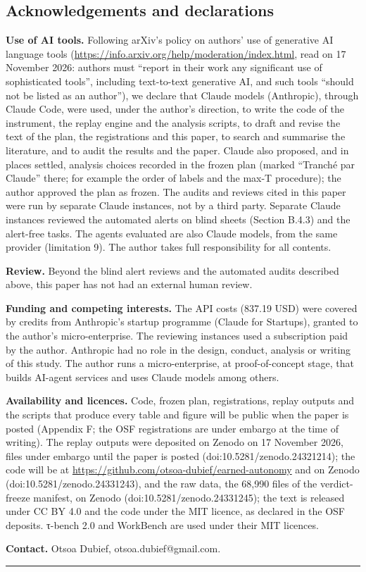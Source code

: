 \subsection{Acknowledgements and declarations}\label{acknowledgements-and-declarations}

\textbf{Use of AI tools.} Following arXiv's policy on authors' use of generative AI language tools (\url{https://info.arxiv.org/help/moderation/index.html}, read on 17 November 2026: authors must ``report in their work any significant use of sophisticated tools'', including text-to-text generative AI, and such tools ``should not be listed as an author''), we declare that Claude models (Anthropic), through Claude Code, were used, under the author's direction, to write the code of the instrument, the replay engine and the analysis scripts, to draft and revise the text of the plan, the registrations and this paper, to search and summarise the literature, and to audit the results and the paper. Claude also proposed, and in places settled, analysis choices recorded in the frozen plan (marked ``Tranché par Claude'' there; for example the order of labels and the max-T procedure); the author approved the plan as frozen. The audits and reviews cited in this paper were run by separate Claude instances, not by a third party. Separate Claude instances reviewed the automated alerts on blind sheets (Section B.4.3) and the alert-free tasks. The agents evaluated are also Claude models, from the same provider (limitation 9). The author takes full responsibility for all contents.

\textbf{Review.} Beyond the blind alert reviews and the automated audits described above, this paper has not had an external human review.

\textbf{Funding and competing interests.} The API costs (837.19 USD) were covered by credits from Anthropic's startup programme (Claude for Startups), granted to the author's micro-enterprise. The reviewing instances used a subscription paid by the author. Anthropic had no role in the design, conduct, analysis or writing of this study. The author runs a micro-enterprise, at proof-of-concept stage, that builds AI-agent services and uses Claude models among others.

\textbf{Availability and licences.} Code, frozen plan, registrations, replay outputs and the scripts that produce every table and figure will be public when the paper is posted (Appendix F; the OSF registrations are under embargo at the time of writing). The replay outputs were deposited on Zenodo on 17 November 2026, files under embargo until the paper is posted (doi:10.5281/zenodo.24321214); the code will be at \url{https://github.com/otsoa-dubief/earned-autonomy} and on Zenodo (doi:10.5281/zenodo.24331243), and the raw data, the 68,990 files of the verdict-freeze manifest, on Zenodo (doi:10.5281/zenodo.24331245); the text is released under CC BY 4.0 and the code under the MIT licence, as declared in the OSF deposits. τ-bench 2.0 and WorkBench are used under their MIT licences.

\textbf{Contact.} Otsoa Dubief, otsoa.dubief@gmail.com.

\begin{center}\rule{0.5\linewidth}{0.5pt}\end{center}

